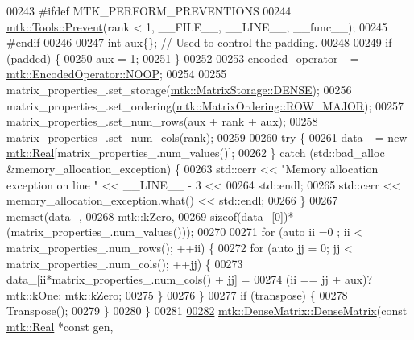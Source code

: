 \begin{DoxyCode}
00243 \textcolor{preprocessor}{  #ifdef MTK\_PERFORM\_PREVENTIONS}
00244   \hyperlink{classmtk_1_1Tools_a332324c6f25e66be9dff48c5987a3b9f}{mtk::Tools::Prevent}(rank < 1, \_\_FILE\_\_, \_\_LINE\_\_, \_\_func\_\_);
00245 \textcolor{preprocessor}{  #endif}
00246 
00247   \textcolor{keywordtype}{int} aux\{\};  \textcolor{comment}{// Used to control the padding.}
00248 
00249   \textcolor{keywordflow}{if} (padded) \{
00250     aux = 1;
00251   \}
00252 
00253   encoded\_operator\_ = \hyperlink{namespacemtk_ga9b50023bfb2692219d2915feade94f80a722d122e81cbbe543bd5520bb8678c0e}{mtk::EncodedOperator::NOOP};
00254 
00255   matrix\_properties\_.set\_storage(\hyperlink{namespacemtk_ga25b67ec6a2afeee69f9bb196a9c66619a0706fbbd929bd8abc4de386c53d439ff}{mtk::MatrixStorage::DENSE});
00256   matrix\_properties\_.set\_ordering(\hyperlink{namespacemtk_ga622801bd9f912d0f976c3e383f5f581ca21541962976d7709c26e9cd8385bd648}{mtk::MatrixOrdering::ROW\_MAJOR});
00257   matrix\_properties\_.set\_num\_rows(aux + rank + aux);
00258   matrix\_properties\_.set\_num\_cols(rank);
00259 
00260   \textcolor{keywordflow}{try} \{
00261     data\_ = \textcolor{keyword}{new} \hyperlink{group__c01-roots_gac080bbbf5cbb5502c9f00405f894857d}{mtk::Real}[matrix\_properties\_.num\_values()];
00262   \} \textcolor{keywordflow}{catch} (std::bad\_alloc &memory\_allocation\_exception) \{
00263     std::cerr << \textcolor{stringliteral}{"Memory allocation exception on line "} << \_\_LINE\_\_ - 3 <<
00264       std::endl;
00265     std::cerr << memory\_allocation\_exception.what() << std::endl;
00266   \}
00267   memset(data\_,
00268          \hyperlink{group__c01-roots_ga59a451a5fae30d59649bcda274fea271}{mtk::kZero},
00269          \textcolor{keyword}{sizeof}(data\_[0])*(matrix\_properties\_.num\_values()));
00270 
00271   \textcolor{keywordflow}{for} (\textcolor{keyword}{auto} ii =0 ; ii < matrix\_properties\_.num\_rows(); ++ii) \{
00272     \textcolor{keywordflow}{for} (\textcolor{keyword}{auto} jj = 0; jj < matrix\_properties\_.num\_cols(); ++jj) \{
00273       data\_[ii*matrix\_properties\_.num\_cols() + jj] =
00274         (ii == jj + aux)? \hyperlink{group__c01-roots_ga26407c24d43b6b95480943340d285c71}{mtk::kOne}: \hyperlink{group__c01-roots_ga59a451a5fae30d59649bcda274fea271}{mtk::kZero};
00275     \}
00276   \}
00277   \textcolor{keywordflow}{if} (transpose) \{
00278     Transpose();
00279   \}
00280 \}
00281 
\hypertarget{mtk__dense__matrix_8cc_source_l00282}{}\hyperlink{classmtk_1_1DenseMatrix_acedaf4058916614d66a18381e624a21d}{00282} \hyperlink{classmtk_1_1DenseMatrix_a0c75ee704707983f935b02835eab0933}{mtk::DenseMatrix::DenseMatrix}(\textcolor{keyword}{const} \hyperlink{group__c01-roots_gac080bbbf5cbb5502c9f00405f894857d}{mtk::Real} *\textcolor{keyword}{const} gen,

\end{DoxyCode}

